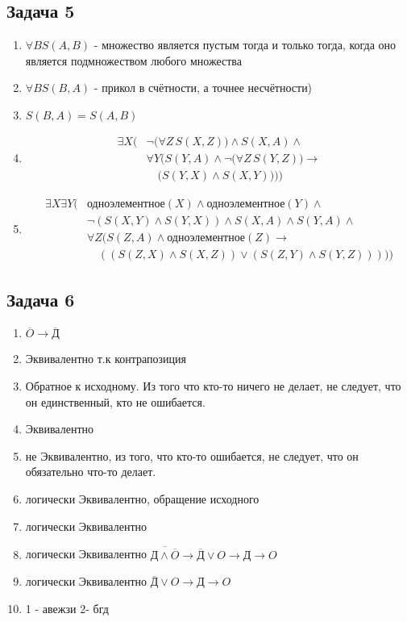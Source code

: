 \documentclass[a4paper,12pt]{article}
\begin{document}
\subsection{Задача 5}
\begin{enumerate}
    \item $\forall B S(A,B)$ - множество является пустым тогда и только тогда, когда оно является подмножеством любого множества
    \item $\forall B S(B, A)$ - прикол в счётности, а точнее несчётности)
    \item $S(B, A) = S(A, B)$
    \item \begin{align*}
        \exists X \big( 
            & \neg \big( \forall Z \, S(X, Z) \big) \land S(X, A) \land \\
            & \forall Y \big( S(Y, A) \land \neg \big( \forall Z \, S(Y, Z) \big) \rightarrow \\
            & \quad \big( S(Y, X) \land S(X, Y) \big) \big) 
        \big)
        \end{align*}
    \item \begin{align*}
        \exists X \exists Y \big( 
            & \text{одноэлементное}(X) \land 
              \text{одноэлементное}(Y) \land \\
            & \neg ( S(X, Y) \land S(Y, X) ) \land S(X, A) \land S(Y, A) \land \\
            & \forall Z \big( S(Z, A) \land \text{одноэлементное}(Z) \rightarrow \\
            & \quad ((S(Z, X) \land S(X, Z)) \lor (S(Z, Y) \land S(Y, Z))) \big) 
        \big)
        \end{align*}
\end{enumerate}

\subsection{Задача 6}
\begin{enumerate}
    \item $\overline{O} \to \overline{Д}$
    \item Эквивалентно т.к контрапозиция
    \item Обратное к исходному. Из того что кто-то ничего не делает, не следует, что он единственный, кто не ошибается.
    \item Эквивалентно
    \item не Эквивалентно, из того, что кто-то ошибается, не следует, что он обязательно что-то делает.
    \item логически Эквивалентно, обращение исходного
    \item логически Эквивалентно
    \item логически Эквивалентно $\overline{Д \land \overline{O}} \to \overline{Д} \lor O \to Д \to O$
    \item логически Эквивалентно $\overline{Д} \lor O \to Д \to O$
    \item 1 - авежзи 2- бгд
\end{enumerate}
\end{document}
